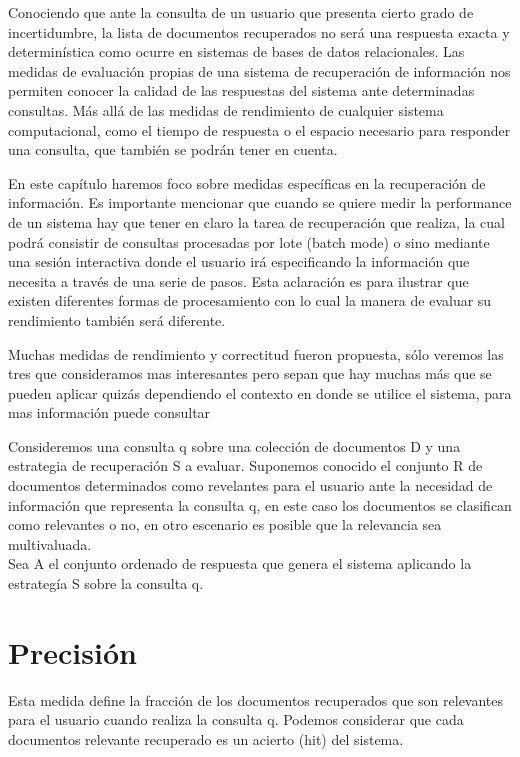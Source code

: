 
Conociendo que ante la consulta de un usuario que presenta cierto grado de incertidumbre, la lista de documentos recuperados no será una respuesta exacta y determinística como ocurre en sistemas de bases de datos relacionales. Las medidas de evaluación propias de una sistema de recuperación de información nos permiten conocer la calidad de las respuestas del sistema ante determinadas consultas. Más allá de las medidas de rendimiento de cualquier sistema computacional, como el tiempo de respuesta o el espacio necesario para responder una consulta, que también se podrán tener en cuenta. \par

En este capítulo haremos foco sobre medidas específicas en la recuperación de información. Es importante mencionar que cuando se quiere medir la performance de un sistema hay que tener en claro la tarea de recuperación que realiza, la cual podrá consistir de consultas procesadas por lote (batch mode) o sino mediante una sesión interactiva donde el usuario irá especificando la información que necesita a través de una serie de pasos. Esta aclaración es para ilustrar que existen diferentes formas de procesamiento con lo cual la manera de evaluar su rendimiento también será diferente. \par

Muchas medidas de rendimiento y correctitud fueron propuesta, sólo veremos las tres que consideramos mas interesantes pero sepan que hay muchas más que se pueden aplicar quizás dependiendo el contexto en donde se utilice el sistema, para mas información puede consultar \cite{baeza1999} \par

Consideremos una consulta q sobre una colección de documentos D y una estrategia de recuperación S a evaluar. Suponemos conocido el conjunto R de documentos determinados como revelantes para el usuario ante la necesidad de información que representa la consulta q, en este caso los documentos se clasifican como relevantes o no, en otro escenario es posible que la relevancia sea multivaluada. \\

Sea A el conjunto ordenado de respuesta que genera el sistema aplicando la estrategía S sobre la consulta q.

\section{Precisión}
Esta medida define la fracción de los documentos recuperados que son relevantes para el usuario cuando realiza la consulta q. Podemos considerar que cada documentos relevante recuperado es un acierto (hit) del sistema. \\

